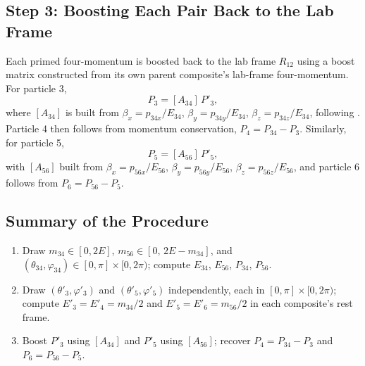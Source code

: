 \documentclass{article}
\begin{document}
\subsection{Step 3: Boosting Each Pair Back to the Lab Frame}
Each primed four-momentum is boosted back to the lab frame $R_{12}$ using a boost matrix constructed from its own parent composite's lab-frame four-momentum. For particle 3,
\begin{equation}
    P_3 = [A_{34}]\, P'_3,
\end{equation}
where $[A_{34}]$ is built from $\beta_x = p_{34x}/E_{34}$, $\beta_y = p_{34y}/E_{34}$, $\beta_z = p_{34z}/E_{34}$, following . Particle 4 then follows from momentum conservation, $P_4 = P_{34} - P_3$. Similarly, for particle 5,
\begin{equation}
    P_5 = [A_{56}]\, P'_5,
\end{equation}
with $[A_{56}]$ built from $\beta_x = p_{56x}/E_{56}$, $\beta_y = p_{56y}/E_{56}$, $\beta_z = p_{56z}/E_{56}$, and particle 6 follows from $P_6 = P_{56} - P_5$.

\subsection{Summary of the Procedure}
\begin{enumerate}
    \item Draw $m_{34} \in [0, 2E]$, $m_{56} \in [0,\, 2E-m_{34}]$, and $(\theta_{34}, \varphi_{34}) \in [0,\pi]\times[0,2\pi)$; compute $E_{34}$, $E_{56}$, $P_{34}$, $P_{56}$.
    \item Draw $(\theta'_3, \varphi'_3)$ and $(\theta'_5, \varphi'_5)$ independently, each in $[0,\pi]\times[0,2\pi)$; compute $E'_3=E'_4=m_{34}/2$ and $E'_5=E'_6=m_{56}/2$ in each composite's rest frame.
    \item Boost $P'_3$ using $[A_{34}]$ and $P'_5$ using $[A_{56}]$; recover $P_4 = P_{34}-P_3$ and $P_6 = P_{56}-P_5$.
\end{enumerate}

\newpage


\end{document}
